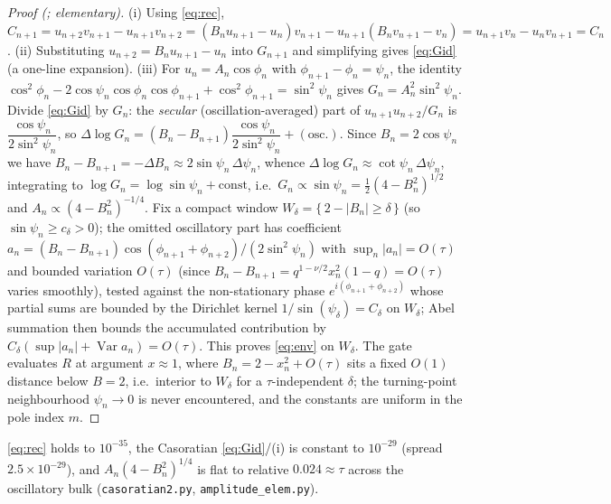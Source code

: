 \begin{proof}[Proof \textnormal{(\proved; elementary)}]
\textnormal{(i)} Using \eqref{eq:rec},
$C_{n+1}=u_{n+2}v_{n+1}-u_{n+1}v_{n+2}=(B_nu_{n+1}-u_n)v_{n+1}-u_{n+1}(B_nv_{n+1}-v_n)
=u_{n+1}v_n-u_nv_{n+1}=C_n$.
\textnormal{(ii)} Substituting $u_{n+2}=B_nu_{n+1}-u_n$ into $G_{n+1}$ and simplifying gives
\eqref{eq:Gid} (a one-line expansion).
\textnormal{(iii)} For $u_n=A_n\cos\phi_n$ with $\phi_{n+1}-\phi_n=\psi_n$, the identity
$\cos^2\phi_n-2\cos\psi_n\cos\phi_n\cos\phi_{n+1}+\cos^2\phi_{n+1}=\sin^2\psi_n$ gives
$G_n=A_n^2\sin^2\psi_n$. Divide \eqref{eq:Gid} by $G_n$: the \emph{secular}
(oscillation-averaged) part of $u_{n+1}u_{n+2}/G_n$ is $\dfrac{\cos\psi_n}{2\sin^2\psi_n}$, so
$\Delta\log G_n=(B_n-B_{n+1})\dfrac{\cos\psi_n}{2\sin^2\psi_n}+(\text{osc.})$. Since
$B_n=2\cos\psi_n$ we have $B_n-B_{n+1}=-\Delta B_n\approx 2\sin\psi_n\,\Delta\psi_n$, whence
$\Delta\log G_n\approx\cot\psi_n\,\Delta\psi_n$, integrating to
$\log G_n=\log\sin\psi_n+\mathrm{const}$, i.e.\ $G_n\propto\sin\psi_n=\tfrac12(4-B_n^2)^{1/2}$
and $A_n\propto(4-B_n^2)^{-1/4}$. Fix a compact window $W_\delta=\{\,2-|B_n|\ge\delta\,\}$
(so $\sin\psi_n\ge c_\delta>0$); the omitted oscillatory part has coefficient
$a_n=(B_n-B_{n+1})\cos(\phi_{n+1}+\phi_{n+2})/(2\sin^2\psi_n)$ with
$\sup_n|a_n|=O(\tau)$ and bounded variation $O(\tau)$ (since
$B_n-B_{n+1}=q^{1-\nu/2}x_n^2(1-q)=O(\tau)$ varies smoothly), tested against the
non-stationary phase $e^{i(\phi_{n+1}+\phi_{n+2})}$ whose partial sums are bounded by the
Dirichlet kernel $1/\sin(\psi_{\delta})=C_\delta$ on $W_\delta$; Abel summation then bounds the
accumulated contribution by $C_\delta(\sup|a_n|+\operatorname{Var}a_n)=O(\tau)$. This proves
\eqref{eq:env} on $W_\delta$. The gate evaluates $R$ at argument $x\approx1$, where
$B_n=2-x_n^2+O(\tau)$ sits a fixed $O(1)$ distance below $B=2$, i.e.\ interior to $W_\delta$
for a $\tau$-independent $\delta$; the turning-point neighbourhood $\psi_n\to0$ is never
encountered, and the constants are uniform in the pole index $m$.
\end{proof}

\begin{remark}[\checked]
\eqref{eq:rec} holds to $10^{-35}$, the Casoratian \eqref{eq:Gid}/(i) is constant to
$10^{-29}$ (spread $2.5\times10^{-29}$), and $A_n(4-B_n^2)^{1/4}$ is flat to relative
$0.024\approx\tau$ across the oscillatory bulk (\texttt{casoratian2.py},
\texttt{amplitude\_elem.py}).
\end{remark}

